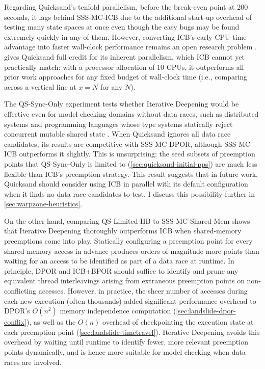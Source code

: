 Regarding Quicksand's tenfold parallelism,
before the break-even point at 200 seconds,
it lags behind SSS-MC-ICB due to the additional start-up overhead
of testing many state spaces at once even though the easy bugs may be found extremely quickly in any of them.
However, converting ICB's early CPU-time advantage
into faster wall-clock performance remains an open research problem \cite{parallel-dpor}.
 gives Quicksand full credit for its inherent parallelism,
which ICB cannot yet practically match:
with a processor allocation of 10 CPUs, it outperforms all prior work approaches
for any fixed budget of wall-clock time
(i.e., comparing across a vertical line at $x=N$ for any $N$).

The QS-Sync-Only experiment tests whether Iterative Deepening would be effective
even for model checking domains without data races,
such as distributed systems \cite{macemc,modist,samc,dbug-retreat,concuerror}
and programming languages whose type systems statically reject concurrent mutable shared state
\cite{erlang,haskell,rust-book}.
When Quicksand ignores all data race candidates,
its results are competitive with SSS-MC-DPOR, although SSS-MC-ICB outperforms it slightly.
This is unsurprising: the seed subsets of preemption points
that QS-Sync-Only is limited to
(\cref{sec:quicksand-initial-pps})
are much less flexible than ICB's preemption strategy.
This result suggests that in future work,
Quicksand should consider using ICB in parallel with its default configuration when it finds no data race candidates to test.
I discuss this possibility further in \cref{sec:warpzone-heuristics}.

On the other hand,
comparing QS-Limited-HB to SSS-MC-Shared-Mem
shows that Iterative Deepening thoroughly outperforms ICB when shared-memory preemptions come into play.
Statically configuring a preemption point for every shared memory access in advance
produces orders of magnitude more points than
waiting for an access to be identified as part of a data race at runtime.
%
In principle, DPOR and ICB+BPOR should suffice to identify and prune any equivalent thread interleavings
arising from extraneous preemption points on non-conflicting accesses.
However, in practice,
the sheer number of accesses during each new execution
(often thousands)
added significant performance overhead to
DPOR's $O(n^2)$ memory independence computation (\cref{sec:landslide-dpor-conflix}),
as well as the $O(n)$ overhead of checkpointing the execution state at each preemption point (\cref{sec:landslide-timetravel}).
Iterative Deepening avoids this overhead by waiting until runtime
to identify fewer, more relevant preemption points dynamically,
and is hence more suitable for model checking when data races are involved.

